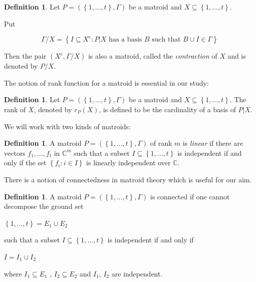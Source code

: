 \documentclass[12pt, reqno]{amsart}
\theoremstyle{definition}
\newtheorem{definition}[theorem]{Definition}
\theoremstyle{remark}
\numberwithin{equation}{section}
\begin{document}
\begin{definition}\label{cont}
	Let $P=(\left\{1,...,t\right\},\varGamma)$ be a matroid and $X\subseteq \left\{1,...,t\right\}$.
	
	Put 
	
	\[
	\varGamma/X = \left\{ I \subseteq X^c: P|X \text{ has a basis } B \text{ such that } B \cup I \in \varGamma \right\}
	\]
	
	Then the pair 
	$(X^c,\varGamma/X)$ is also a matroid, called the \emph{contraction} of $X$  and is denoted by $P/X$.
	
	
\end{definition}



The notion of  rank function for a matroid is essential in our study:

\begin{definition}
	Let $P=(\left\{1,...,t\right\},\varGamma)$ be a matroid and $X\subseteq \left\{1,...,t\right\}$. The rank of $X$, denoted by $r_{P}(X)$, is defined to be the cardinality of a basis of $P|X$.
\end{definition}



We will work with two kinds of matroids:

\begin{definition}
		A  matroid $P=(\left\{1,...,t\right\},\varGamma)$ of rank $m$ is \emph{linear} if there are
		  vectors 
		 	$f_1,...,f_t$ in $\mathbb{C}^m$
		 	such that  a subset
		 	$I\subseteq \left\{1,...,t\right\}$
		 	is independent if and only if
		 	the set $\left\{f_i:i\in I\right\}$	is linearly independent over $\mathbb{C}$.
\end{definition}
 There is a notion of connectedness in matroid theory which is useful for our aim.

\begin{definition}
	A  matroid $P=(\left\{1,...,t\right\},\varGamma)$  is
	connected if one cannot decompose the ground set 
\begin{center}
		$\left\{1,...,t\right\}=E_1\cup E_2$
\end{center}
	such that
	 a subset
	$I\subseteq \left\{1,...,t\right\}$
	is independent if and only if
	
	\begin{center}
		$I=I_1\cup I_2$
	\end{center}
	where
	$I_1\subseteq E_1$
	,
		$I_2\subseteq E_2$
	 and $I_1$, $I_2$
	are independent.
	
	
\end{definition}
\end{document}
